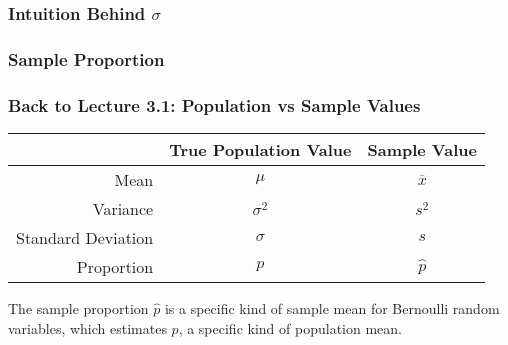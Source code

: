 \documentclass[handout]{beamer}
\newcommand{\blue}[1]{\textcolor{blue2}{#1}}
\begin{document}
\begin{frame}[fragile]
\frametitle{Intuition Behind $\sigma$}


\end{frame}


\begin{frame}[fragile]
\frametitle{Sample Proportion}

%
%
%
%

\end{frame}


\begin{frame}[fragile]
\frametitle{Back to Lecture 3.1: Population vs Sample Values}

\begin{center}
  \begin{tabular}{r|cc}
	\hline	
     & True Population Value & Sample Value \\ 
	\hline	
    Mean & $\mu$ & $\overline{x}$ \\ 
    Variance & $\sigma^2$ & $s^2$ \\ 
    Standard Deviation & $\sigma$ & $s$ \\ 
    \blue{Proportion} & \blue{$p$} & \blue{$\widehat{p}$} \\
	\hline	
  \end{tabular}
\end{center}

\vspace{0.5cm}

\pause The \blue{sample proportion $\widehat{p}$} is a specific kind of \blue{sample mean} for Bernoulli random variables, which \blue{estimates $p$}, a specific kind of population mean.  

\end{frame}
\end{document}

